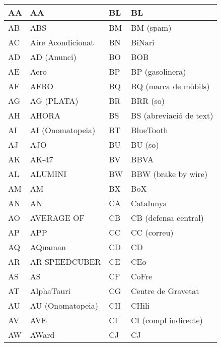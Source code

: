 \begin{table}[!ht]
    \centering
    \begin{tabular}{|l|l|l|l|}
    \hline
    AA & AA                 & BL & BL                      \\ \hline
    AB & ABS                & BM & BM (spam)               \\ \hline
    AC & Aire Acondicionat  & BN & BiNari                  \\ \hline
    AD & AD (Anunci)        & BO & BOB                     \\ \hline
    AE & Aero               & BP & BP (gasolinera)         \\ \hline
    AF & AFRO               & BQ & BQ (marca de mòbils)    \\ \hline
    AG & AG (PLATA)         & BR & BRR (so)                \\ \hline
    AH & AHORA              & BS & BS (abreviació de text) \\ \hline
    AI & AI (Onomatopeia)   & BT & BlueTooth               \\ \hline
    AJ & AJO                & BU & BU (so)                 \\ \hline
    AK & AK-47              & BV & BBVA                    \\ \hline
    AL & ALUMINI            & BW & BBW (brake by wire)     \\ \hline
    AM & AM                 & BX & BoX                     \\ \hline
    AN & AN                 & CA & Catalunya               \\ \hline
    AO & AVERAGE OF         & CB & CB (defensa central)    \\ \hline
    AP & APP                & CC & CC (correu)             \\ \hline
    AQ & AQuaman            & CD & CD                      \\ \hline
    AR & AR SPEEDCUBER      & CE & CEo                     \\ \hline
    AS & AS                 & CF & CoFre                   \\ \hline
    AT & AlphaTauri         & CG & Centre de Gravetat      \\ \hline
    AU & AU (Onomatopeia)   & CH & CHili                   \\ \hline
    AV & AVE                & CI & CI (compl indirecte)    \\ \hline
    AW & AWard              & CJ & CJ                      \\ \hline

\end{tabular}
\end{table}
